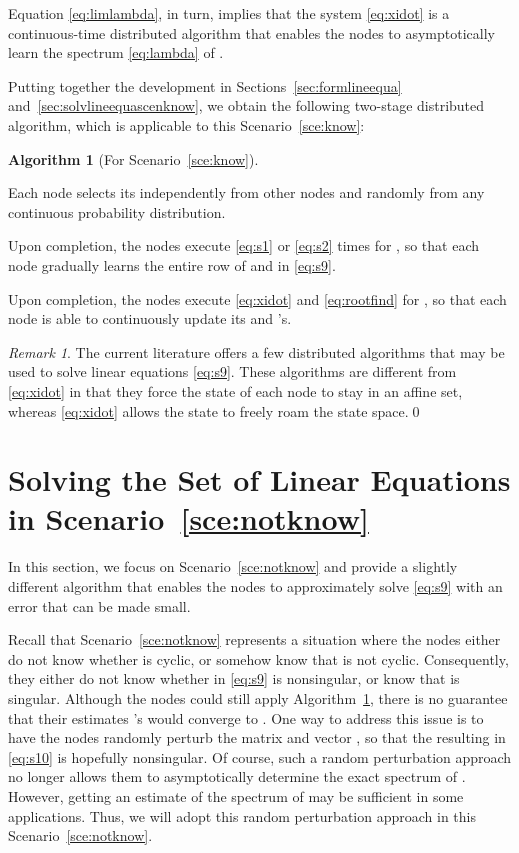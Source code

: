 \documentclass[11pt]{article}
\theoremstyle{plain}
\theoremstyle{definition}
\newtheorem{algorithm}{Algorithm}
\theoremstyle{remark}
\newtheorem{remark}{Remark}
\newenvironment{algorithmstep}{\ \begin{list}{\labelenumi}{\topsep0in\itemsep0in\parsep0in\labelwidth1in\usecounter{enumi}}}{\hfill\end{list}}
\begin{document}
Equation \eqref{eq:limlambda}, in turn, implies that the system \eqref{eq:xidot} is a continuous-time distributed algorithm that enables the nodes to asymptotically learn the spectrum \eqref{eq:lambda} of .

Putting together the development in Sections~\ref{sec:formlineequa} and~\ref{sec:solvlineequascenknow}, we obtain the following two-stage distributed algorithm, which is applicable to this Scenario~\ref{sce:know}:

\begin{algorithm}[For Scenario~\ref{sce:know}]\label{alg:know}
\begin{algorithmstep}
\item Each node  selects its  independently from other nodes and randomly from any continuous probability distribution.
\item Upon completion, the nodes execute \eqref{eq:s1} or \eqref{eq:s2}  times for , so that each node  gradually learns the entire row  of  and  in \eqref{eq:s9}.
\item Upon completion, the nodes execute \eqref{eq:xidot} and \eqref{eq:rootfind} for , so that each node  is able to continuously update its  and 's.
\end{algorithmstep}
\end{algorithm}

\begin{remark}\label{rem:lite}
The current literature offers a few distributed algorithms \cite{Nedic10, MouS13} that may be used to solve linear equations \eqref{eq:s9}. These algorithms are different from \eqref{eq:xidot} in that they force the state of each node to stay in an affine set, whereas \eqref{eq:xidot} allows the state to freely roam the state space.\qed
\end{remark}

\section{Solving the Set of Linear Equations in Scenario~\ref{sce:notknow}}\label{sec:solvlineequascennotknow}

In this section, we focus on Scenario~\ref{sce:notknow} and provide a slightly different algorithm that enables the nodes to approximately solve \eqref{eq:s9} with an error that can be made small.

Recall that Scenario~\ref{sce:notknow} represents a situation where the nodes either do not know whether  is cyclic, or somehow know that  is not cyclic. Consequently, they either do not know whether  in \eqref{eq:s9} is nonsingular, or know that  is singular. Although the nodes could still apply Algorithm~\ref{alg:know}, there is no guarantee that their estimates 's would converge to . One way to address this issue is to have the nodes randomly perturb the matrix  and vector , so that the resulting  in \eqref{eq:s10} is hopefully nonsingular. Of course, such a random perturbation approach no longer allows them to asymptotically determine the exact spectrum of . However, getting an estimate of the spectrum of  may be sufficient in some applications. Thus, we will adopt this random perturbation approach in this Scenario~\ref{sce:notknow}.
\end{document}
